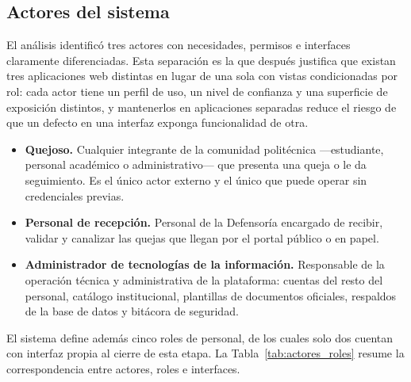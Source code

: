 	\subsection{Actores del sistema}
	\label{sec:actores}
	El análisis identificó tres actores con necesidades, permisos e interfaces claramente
	diferenciadas. Esta separación es la que después justifica que existan tres aplicaciones web
	distintas en lugar de una sola con vistas condicionadas por rol: cada actor tiene un perfil de
	uso, un nivel de confianza y una superficie de exposición distintos, y mantenerlos en
	aplicaciones separadas reduce el riesgo de que un defecto en una interfaz exponga
	funcionalidad de otra.
	
	\begin{itemize}
		\item \textbf{Quejoso.} Cualquier integrante de la comunidad politécnica ---estudiante,
		personal académico o administrativo--- que presenta una queja o le da seguimiento. Es el
		único actor externo y el único que puede operar sin credenciales previas.
	
		\item \textbf{Personal de recepción.} Personal de la Defensoría encargado de recibir,
		validar y canalizar las quejas que llegan por el portal público o en papel.
	
		\item \textbf{Administrador de tecnologías de la información.} Responsable de la operación
		técnica y administrativa de la plataforma: cuentas del resto del personal, catálogo
		institucional, plantillas de documentos oficiales, respaldos de la base de datos y bitácora
		de seguridad.
	\end{itemize}
	
	El sistema define además cinco roles de personal, de los cuales solo dos cuentan con interfaz
	propia al cierre de esta etapa. La Tabla~\ref{tab:actores_roles} resume la correspondencia
	entre actores, roles e interfaces.
	
	
	\small
	\renewcommand{\arraystretch}{1.25}
	\setlength{\tabcolsep}{4pt}
	
